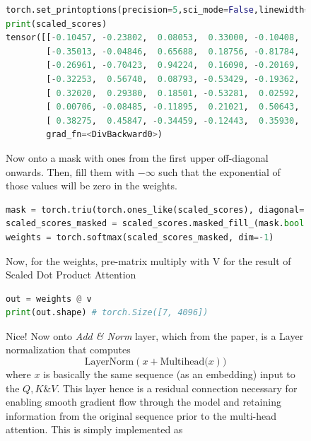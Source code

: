 \documentclass[12pt]{article}
\begin{document}
\begin{figure}[!htb]
    \begin{minipage}[t]{0.65\textwidth}
    \raggedright
    
\begin{lstlisting}[language=python,style=python,basicstyle=\ttfamily\tiny]
torch.set_printoptions(precision=5,sci_mode=False,linewidth=500)
print(scaled_scores)
tensor([[-0.10457, -0.23802,  0.08053,  0.33000, -0.10408,  0.55068,  0.68916],
        [-0.35013, -0.04846,  0.65688,  0.18756, -0.81784,  0.10682, -0.74313],
        [-0.26961, -0.70423,  0.94224,  0.16090, -0.20169,  0.15549, -0.28134],
        [-0.32253,  0.56740,  0.08793, -0.53429, -0.19362, -0.22245, -0.38808],
        [ 0.32020,  0.29380,  0.18501, -0.53281,  0.02592, -0.57664,  0.17737],
        [ 0.00706, -0.08485, -0.11895,  0.21021,  0.50643,  0.48187,  0.11625],
        [ 0.38275,  0.45847, -0.34459, -0.12443,  0.35930,  0.65530,  0.03805]], 
        grad_fn=<DivBackward0>)
\end{lstlisting}
Now onto a mask with ones from the first upper off-diagonal onwards. Then, fill them with {\small $-\infty$}
such that the exponential of those values will be zero in the weights. 
\begin{lstlisting}[language=python,style=python,basicstyle=\ttfamily\footnotesize]
mask = torch.triu(torch.ones_like(scaled_scores), diagonal=1)
scaled_scores_masked = scaled_scores.masked_fill_(mask.bool(), -torch.inf)
weights = torch.softmax(scaled_scores_masked, dim=-1)
\end{lstlisting}
Now, for the weights, pre-matrix multiply with {\small V} for the result of Scaled Dot Product Attention
\begin{lstlisting}[language=python,style=python,basicstyle=\ttfamily\footnotesize]
out = weights @ v 
print(out.shape) # torch.Size([7, 4096])
\end{lstlisting}
Nice! Now onto {\it Add \& Norm} layer, which from the paper, is a Layer normalization that computes\\
\vspace{-1.5em}
$$\text{LayerNorm}(x  + \text{Multihead(}x))$$
where $x$ is basically the same sequence (as an embedding) input to the $Q, K \& V$. This layer hence
is a residual connection necessary for enabling smooth gradient flow through the model and retaining 
information from the original sequence prior to the multi-head attention. This is simply implemented as 
\begin{lstlisting}[language=python,style=python,basicstyle=\ttfamily\footnotesize]

\end{lstlisting}
\end{minipage}
\end{figure}
\end{document}
